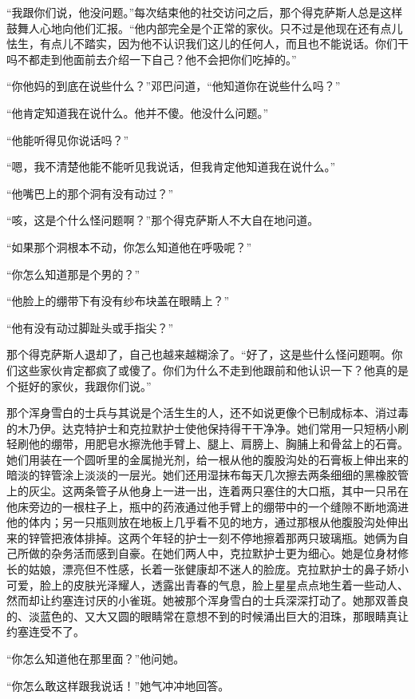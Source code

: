     “我跟你们说，他没问题。”每次结束他的社交访问之后，那个得克萨斯人总是这样鼓舞人心地向他们汇报。“他内部完全是个正常的家伙。只不过是他现在还有点儿怯生，有点儿不踏实，因为他不认识我们这儿的任何人，而且也不能说话。你们干吗不都走到他面前去介绍一下自己？他不会把你们吃掉的。”

    “你他妈的到底在说些什么？”邓巴问道，“他知道你在说些什么吗？”

    “他肯定知道我在说什么。他并不傻。他没什么问题。”

    “他能听得见你说话吗？”

    “嗯，我不清楚他能不能听见我说话，但我肯定他知道我在说什么。”

    “他嘴巴上的那个洞有没有动过？”

    “咳，这是个什么怪问题啊？”那个得克萨斯人不大自在地问道。

    “如果那个洞根本不动，你怎么知道他在呼吸呢？”

    “你怎么知道那是个男的？”

    “他脸上的绷带下有没有纱布块盖在眼睛上？”

    “他有没有动过脚趾头或手指尖？”

    那个得克萨斯人退却了，自己也越来越糊涂了。“好了，这是些什么怪问题啊。你们这些家伙肯定都疯了或傻了。你们为什么不走到他跟前和他认识一下？他真的是个挺好的家伙，我跟你们说。”

    那个浑身雪白的士兵与其说是个活生生的人，还不如说更像个已制成标本、消过毒的木乃伊。达克特护士和克拉默护士使他保持得干干净净。她们常用一只短柄小刷轻刷他的绷带，用肥皂水擦洗他手臂上、腿上、肩膀上、胸脯上和骨盆上的石膏。她们用装在一个圆听里的金属抛光剂，给一根从他的腹股沟处的石膏板上伸出来的暗淡的锌管涂上淡淡的一层光。她们还用湿抹布每天几次擦去两条细细的黑橡胶管上的灰尘。这两条管子从他身上一进一出，连着两只塞住的大口瓶，其中一只吊在他床旁边的一根柱子上，瓶中的药液通过他手臂上的绷带中的一个缝隙不断地滴进他的体内；另一只瓶则放在地板上几乎看不见的地方，通过那根从他腹股沟处伸出来的锌管把液体排掉。这两个年轻的护士一刻不停地擦着那两只玻璃瓶。她俩为自己所做的杂务活而感到自豪。在她们两人中，克拉默护士更为细心。她是位身材修长的姑娘，漂亮但不性感，长着一张健康却不迷人的脸庞。克拉默护士的鼻子娇小可爱，脸上的皮肤光泽耀人，透露出青春的气息，脸上星星点点地生着一些动人、然而却让约塞连讨厌的小雀斑。她被那个浑身雪白的士兵深深打动了。她那双善良的、淡蓝色的、又大又圆的眼睛常在意想不到的时候涌出巨大的泪珠，那眼睛真让约塞连受不了。

    “你怎么知道他在那里面？”他问她。

    “你怎么敢这样跟我说话！”她气冲冲地回答。

